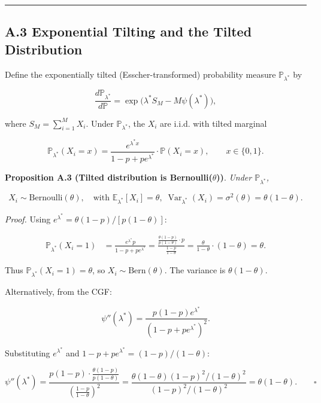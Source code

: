 \documentclass[
  12pt,
]{article}
\begin{document}
\begin{center}\rule{0.5\linewidth}{0.5pt}\end{center}

\subsection{A.3 Exponential Tilting and the Tilted
Distribution}\label{a.3-exponential-tilting-and-the-tilted-distribution}

Define the exponentially tilted (Esscher-transformed) probability
measure \(\mathbb{P}_{\lambda^*}\) by

\[\frac{d\mathbb{P}_{\lambda^*}}{d\mathbb{P}} = \exp\!\big(\lambda^* S_M - M\psi(\lambda^*)\big),\]

where \(S_M = \sum_{i=1}^M X_i\). Under \(\mathbb{P}_{\lambda^*}\), the
\(X_i\) are i.i.d. with tilted marginal

\[\mathbb{P}_{\lambda^*}(X_i = x) = \frac{e^{\lambda^* x}}{1-p + p e^{\lambda^*}} \cdot \mathbb{P}(X_i = x), \qquad x \in \{0,1\}.\]

\textbf{Proposition A.3 (Tilted distribution is Bernoulli(\(\theta\)))}.
\emph{Under \(\mathbb{P}_{\lambda^*}\),}

\[X_i \sim \text{Bernoulli}(\theta), \quad \text{with } \mathbb{E}_{\lambda^*}[X_i] = \theta,\;
\operatorname{Var}_{\lambda^*}(X_i) = \sigma^2(\theta) = \theta(1-\theta).\]

\emph{Proof.} Using \(e^{\lambda^*} = \theta(1-p)/[p(1-\theta)]\):

\[
\begin{aligned}
\mathbb{P}_{\lambda^*}(X_i=1) &= \frac{e^{\lambda^*} p}{1-p + p e^{\lambda^*}}
= \frac{\frac{\theta(1-p)}{p(1-\theta)}\cdot p}{\frac{1-p}{1-\theta}}
= \frac{\theta}{1-\theta} \cdot (1-\theta) = \theta.
\end{aligned}
\]

Thus \(\mathbb{P}_{\lambda^*}(X_i=1)=\theta\), so
\(X_i \sim \text{Bern}(\theta)\). The variance is \(\theta(1-\theta)\).

Alternatively, from the CGF:

\[\psi''(\lambda^*) = \frac{p(1-p)e^{\lambda^*}}{(1-p + p e^{\lambda^*})^2}.\]

Substituting \(e^{\lambda^*}\) and
\(1-p + p e^{\lambda^*} = (1-p)/(1-\theta)\):

\[
\psi''(\lambda^*) = \frac{p(1-p)\cdot\frac{\theta(1-p)}{p(1-\theta)}}{\left(\frac{1-p}{1-\theta}\right)^2}
= \frac{\theta(1-\theta)(1-p)^2/(1-\theta)^2}{(1-p)^2/(1-\theta)^2}
= \theta(1-\theta). \qquad \square
\]
\end{document}
